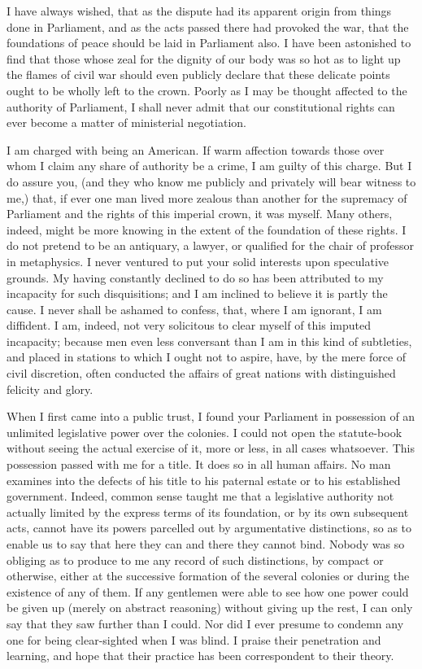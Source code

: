 I have always wished, that as the dispute had its apparent origin from things done in Parliament, and as the acts passed there had provoked the war, that the foundations of peace should be laid in Parliament also. I have been astonished to find that those whose zeal for the dignity of our body was so hot as to light up the flames of civil war should even publicly declare that these delicate points ought to be wholly left to the crown. Poorly as I may be thought affected to the authority of Parliament, I shall never admit that our constitutional rights can ever become a matter of ministerial negotiation.

I am charged with being an American. If warm affection towards those over whom I claim any share of authority be a crime, I am guilty of this charge. But I do assure you, (and they who know me publicly and privately will bear witness to me,) that, if ever one man lived more zealous than another for the supremacy of Parliament and the rights of this imperial crown, it was myself. Many others, indeed, might be more knowing in the extent of the foundation of these rights. I do not pretend to be an antiquary, a lawyer, or qualified for the chair of professor in metaphysics. I never ventured to put your solid interests upon speculative grounds. My having constantly declined to do so has been attributed to my incapacity for such disquisitions; and I am inclined to believe it is partly the cause. I never shall be ashamed to confess, that, where I am ignorant, I am diffident. I am, indeed, not very solicitous to clear myself of this imputed incapacity; because men even less conversant than I am in this kind of subtleties, and placed in stations to which I ought not to aspire, have, by the mere force of civil discretion, often conducted the affairs of great nations with distinguished felicity and glory.

When I first came into a public trust, I found your Parliament in possession of an unlimited legislative power over the colonies. I could not open the statute-book without seeing the actual exercise of it, more or less, in all cases whatsoever. This possession passed with me for a title. It does so in all human affairs. No man examines into the defects of his title to his paternal estate or to his established government. Indeed, common sense taught me that a legislative authority not actually limited by the express terms of its foundation, or by its own subsequent acts, cannot have its powers parcelled out by argumentative distinctions, so as to enable us to say that here they can and there they cannot bind. Nobody was so obliging as to produce to me any record of such distinctions, by compact or otherwise, either at the successive formation of the several colonies or during the existence of any of them. If any gentlemen were able to see how one power could be given up (merely on abstract reasoning) without giving up the rest, I can only say that they saw further than I could. Nor did I ever presume to condemn any one for being clear-sighted when I was blind. I praise their penetration and learning, and hope that their practice has been correspondent to their theory.

